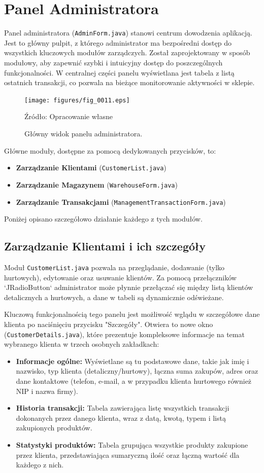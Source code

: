 \section{Panel Administratora}
Panel administratora (\texttt{AdminForm.java}) stanowi centrum dowodzenia aplikacją. Jest to główny pulpit, z którego administrator ma bezpośredni dostęp do wszystkich kluczowych modułów zarządczych. Został zaprojektowany w sposób modułowy, aby zapewnić szybki i intuicyjny dostęp do poszczególnych funkcjonalności. W centralnej części panelu wyświetlana jest tabela z listą ostatnich transakcji, co pozwala na bieżące monitorowanie aktywności w sklepie.

\begin{figure}[H]
    \centering
    \texttt{[image: figures/fig\_0011.eps]}
    \caption{Główny widok panelu administratora.}
    \label{fig:admin_form}
    \small{Źródło: Opracowanie własne}
\end{figure}

Główne moduły, dostępne za pomocą dedykowanych przycisków, to:
\begin{itemize}
    \item \textbf{Zarządzanie Klientami} (\texttt{CustomerList.java})
    \item \textbf{Zarządzanie Magazynem} (\texttt{WarehouseForm.java})
    \item \textbf{Zarządzanie Transakcjami} (\texttt{ManagementTransactionForm.java})
\end{itemize}
Poniżej opisano szczegółowo działanie każdego z tych modułów.

\subsection{Zarządzanie Klientami i ich szczegóły}
Moduł \texttt{CustomerList.java} pozwala na przeglądanie, dodawanie (tylko hurtowych), edytowanie oraz usuwanie klientów. Za pomocą przełączników `JRadioButton` administrator może płynnie przełączać się między listą klientów detalicznych a hurtowych, a dane w tabeli są dynamicznie odświeżane.

Kluczową funkcjonalnością tego panelu jest możliwość wglądu w szczegółowe dane klienta po naciśnięciu przycisku "Szczegóły". Otwiera to nowe okno (\texttt{CustomerDetails.java}), które prezentuje kompleksowe informacje na temat wybranego klienta w trzech osobnych zakładkach:
\begin{itemize}
    \item \textbf{Informacje ogólne:} Wyświetlane są tu podstawowe dane, takie jak imię i nazwisko, typ klienta (detaliczny/hurtowy), łączna suma zakupów, adres oraz dane kontaktowe (telefon, e-mail, a w przypadku klienta hurtowego również NIP i nazwa firmy).
    \item \textbf{Historia transakcji:} Tabela zawierająca listę wszystkich transakcji dokonanych przez danego klienta, wraz z datą, kwotą, typem i listą zakupionych produktów.
    \item \textbf{Statystyki produktów:} Tabela grupująca wszystkie produkty zakupione przez klienta, przedstawiająca sumaryczną ilość oraz łączną wartość dla każdego z nich.
\end{itemize}


